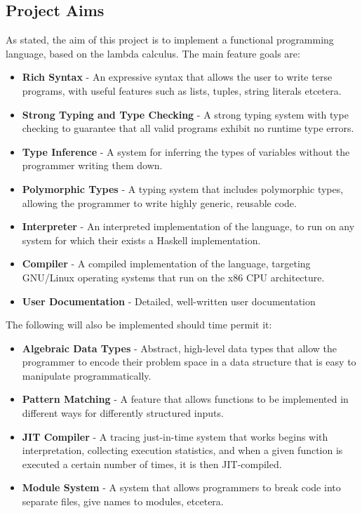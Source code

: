 \documentclass{article}
\begin{document}
\subsection{Project Aims} %
As stated, the aim of this project is to implement a functional programming language, based on the lambda calculus. The main feature goals are:
\begin{itemize}
    \item \textbf{Rich Syntax} - An expressive syntax that allows the user to write terse programs, with useful features such as lists, tuples, string literals etcetera.
    \item \textbf{Strong Typing and Type Checking} - A strong typing system with type checking to guarantee that all valid programs exhibit no runtime type errors.
    \item \textbf{Type Inference} - A system for inferring the types of variables without the programmer writing them down.
    \item \textbf{Polymorphic Types} - A typing system that includes polymorphic types, allowing the programmer to write highly generic, reusable code.
    \item \textbf{Interpreter} - An interpreted implementation of the language, to run on any system for which their exists a Haskell implementation.
    \item \textbf{Compiler} - A compiled implementation of the language, targeting GNU/Linux operating systems that run on the x86 CPU architecture.
    \item \textbf{User Documentation} - Detailed, well-written user documentation
\end{itemize}
The following will also be implemented should time permit it:
\begin{itemize}
    \item \textbf{Algebraic Data Types} - Abstract, high-level data types that allow the programmer to encode their problem space in a data structure that is easy to manipulate programmatically.
    \item \textbf{Pattern Matching} - A feature that allows functions to be implemented in different ways for differently structured inputs.
    \item \textbf{JIT Compiler} - A tracing just-in-time system that works begins with interpretation, collecting execution statistics, and when a given function is executed a certain number of times, it is then JIT-compiled.
    \item \textbf{Module System} - A system that allows programmers to break code into separate files, give names to modules, etcetera.
\end{itemize}
\end{document}
